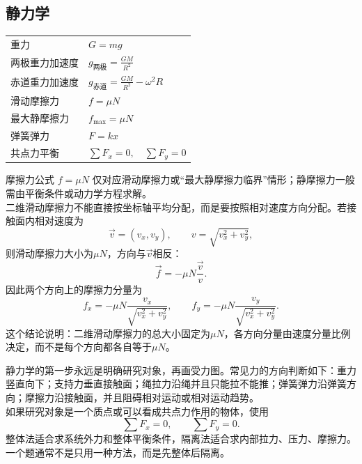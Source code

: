 
\subsection{静力学}
\begin{tabularx}{\columnwidth}{XX}
  重力      & $G=mg$                                   \\
  两极重力加速度 & $g_{\text{两极}}=\frac{GM}{R^2}$           \\
  赤道重力加速度 & $g_{\text{赤道}}=\frac{GM}{R^2}-\omega^2R$ \\
  滑动摩擦力   & $f=\mu N$                                \\
  最大静摩擦力  & $f_{\max}=\mu N$                         \\
  弹簧弹力    & $F=kx$                                   \\
  共点力平衡   & $\sum F_x=0,\quad \sum F_y=0$            \\
\end{tabularx}
\begin{formulanotebox}
  摩擦力公式 $f=\mu N$ 仅对应滑动摩擦力或“最大静摩擦力临界”情形；静摩擦力一般需由平衡条件或动力学方程求解。\\
  二维滑动摩擦力不能直接按坐标轴平均分配，而是要按照相对速度方向分配。若接触面内相对速度为
  \[
    \vec v=(v_x,v_y),\qquad v=\sqrt{v_x^2+v_y^2},
  \]
  则滑动摩擦力大小为$\mu N$，方向与$\vec v$相反：
  \[
    \vec f=-\mu N\frac{\vec v}{v}.
  \]
  因此两个方向上的摩擦力分量为
  \[
    f_x=-\mu N\frac{v_x}{\sqrt{v_x^2+v_y^2}},
    \qquad
    f_y=-\mu N\frac{v_y}{\sqrt{v_x^2+v_y^2}}.
  \]
  这个结论说明：二维滑动摩擦力的总大小固定为$\mu N$，各方向分量由速度分量比例决定，而不是每个方向都各自等于$\mu N$。
\end{formulanotebox}

\begin{keypointbox}
  静力学的第一步永远是明确研究对象，再画受力图。常见力的方向判断如下：重力竖直向下；支持力垂直接触面；绳拉力沿绳并且只能拉不能推；弹簧弹力沿弹簧方向；摩擦力沿接触面，并且阻碍相对运动或相对运动趋势。\\
  如果研究对象是一个质点或可以看成共点力作用的物体，使用
  \[
    \sum F_x=0,\qquad \sum F_y=0.
  \]
  整体法适合求系统外力和整体平衡条件，隔离法适合求内部拉力、压力、摩擦力。一个题通常不是只用一种方法，而是先整体后隔离。
\end{keypointbox}


